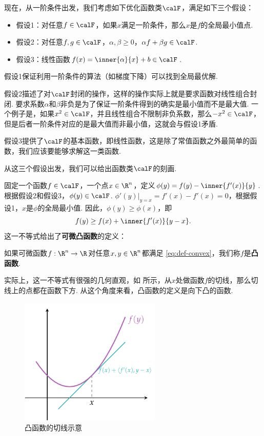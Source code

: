 现在，从一阶条件出发，我们考虑如下优化函数类$\calF$，满足如下三个假设：
\begin{itemize}
    \item 假设1：对任意$f\in\calF$，如果$x$满足一阶条件，那么$x$是$f$的全局最小值点.
    \item 假设2：对任意$f,g\in\calF$，$\alpha,\beta\geq 0$，$\alpha f+\beta g\in\calF$.
    \item 假设3：线性函数$f(x)=\inner{\alpha}{x}+b\in\calF$.
\end{itemize}

假设1保证利用一阶条件的算法（如梯度下降）可以找到全局最优解. 

假设2描述了对$\calF$封闭的操作，这样的操作实际上就是要求函数对线性组合封闭. 要求系数$\alpha$和$\beta$非负是为了保证一阶条件得到的确实是最小值而不是最大值. 一个例子是，如果$x^2\in\calF$，并且线性组合不限制非负系数，那么$-x^2\in\calF$，但是后者一阶条件对应的是最大值而非最小值，这就会与假设1矛盾.  

假设3提供了$\calF$的基本函数，即线性函数，这是除了常值函数之外最简单的函数，我们应该要能够求解这一类函数.

从这三个假设出发，我们可以给出函数类$\calF$的刻画. 

固定一个函数$f\in\calF$，一个点$x\in\R^n$，定义$\phi(y)=f(y)-\inner{f'(x)}{y}$. 根据假设2和假设3，$\phi(y)\in\calF$. $\phi'(y)|_{y=x}=f'(x)-f'(x)=0$，根据假设1，$x$是$\phi$的全局最小值. 因此，$\phi(y)\geq\phi(x)$，即
\begin{equation}
    f(y)\geq f(x)+\inner{f'(x)}{y-x}.\label{eq:def-convex}
\end{equation}
这一不等式给出了\textbf{可微凸函数}的定义：

\begin{definition}[可微凸函数]
    如果可微函数$f:\R^n\to\R$对任意$x,y\in\R^n$都满足 \eqref{eq:def-convex}，我们称$f$是\textbf{凸函数}. 
\end{definition}

实际上，这一不等式有很强的几何直观，如 所示，从$x$处做函数$f$的切线，那么切线上的点都在函数下方. 从这个角度来看，凸函数的定义是向下凸的函数.

\begin{figure}[ht]
    \centering
    \includegraphics[width=0.6\textwidth]{Figures/convex-anlaysis/convex-tangent.pdf}
    \caption{凸函数的切线示意}
    \label{fig:convex-tangent}
\end{figure}

